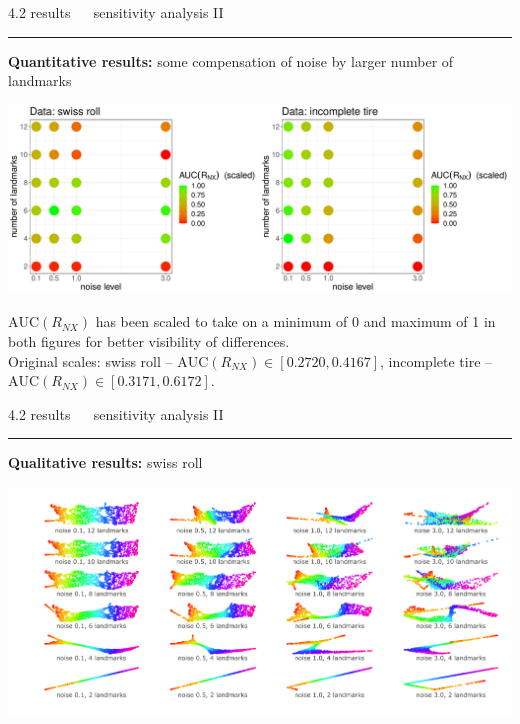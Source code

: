 \documentclass[11pt, compress, t, notes = noshow, xcolor = table, 
aspectratio = 1610]{beamer}
\begin{document}

\LARGE
\begin{frame}{\textcolor{gray!90}{4.2 results} ~~ sensitivity analysis II}
\normalsize
\vspace{-0.5cm}
\noindent \textcolor{gray!90}{\rule{\textwidth}{1pt}}
\smallskip

\textbf{Quantitative results:} some compensation of noise by larger number of 
landmarks

\vspace{0.3cm}

\includegraphics[trim = 0 0 0 0, clip, %
    width = \textwidth]{figures/sensitivity_noise_auc}

\vfill

\scriptsize
$\text{AUC}(R_{NX})$ has been scaled to take on a minimum of 0 and maximum of 1 
in both figures for better visibility of differences. \\
Original scales: swiss roll -- $\text{AUC}(R_{NX}) \in [0.2720, 0.4167]$, 
incomplete tire -- $\text{AUC}(R_{NX}) \in [0.3171, 0.6172]$.

\end{frame}


\LARGE
\begin{frame}{\textcolor{gray!90}{4.2 results} ~~ sensitivity analysis II}
\normalsize
\vspace{-0.5cm}
\noindent \textcolor{gray!90}{\rule{\textwidth}{1pt}}
\smallskip

\textbf{Qualitative results:} swiss roll

\vspace{0.3cm}

\includegraphics[trim = 40 20 0 0, clip, %
    width = \textwidth]{figures/sensitivity_noise_qual_swiss_roll}

\end{frame}
\end{document}
